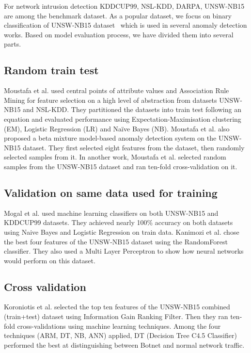\documentclass[14pt, conference]{IEEEtran}
\begin{document}
For network intrusion detection KDDCUP99, NSL-KDD, DARPA, UNSW-NB15 are among the benchmark dataset. As a popular dataset, we focus on binary classification of UNSW-NB15 dataset~\cite{moustafa2015unsw}  which is used in  several anomaly detection works. Based on model evaluation process, we have divided them into several parts.

\subsection{Random train test}
Moustafa et al.\cite{moustafa2017hybrid} used central points of attribute values and Association Rule Mining for feature
selection on a high level of abstraction from datasets UNSW-NB15 and NSL-KDD. They partitioned the datasets into train test following an equation and evaluated performance using Expectation-Maximisation clustering (EM), Logistic Regression (LR) and Naïve Bayes (NB).
Moustafa et al. \cite{moustafa2018anomaly} also proposed a beta mixture
model-based anomaly detection system on the UNSW-NB15 dataset. They first selected eight features from the dataset,
then randomly selected samples from it.
In another work, Moustafa et al. \cite{moustafa2019holistic} selected random samples from
the UNSW-NB15 dataset and ran ten-fold cross-validation on it. %

\subsection{Validation on same data used for training}
Mogal et al.\cite{mogal2017nids} used machine learning classifiers on both UNSW-NB15 and KDDCUP99 datasets.
They achieved nearly 100\% accuracy on both datasets using Naive Bayes and Logistic Regression on train data. Kanimozi et al. \cite{Kanimozhi2019UNSW-NB15} chose the best four features of
the UNSW-NB15 dataset using the RandomForest classifier. They also used a Multi Layer Perceptron to show how neural
networks would perform on this dataset.

\subsection{Cross validation}
Koroniotis et al.\cite{koroniotis2017towards} selected the top ten features of the UNSW-NB15 combined (train+test)
dataset using Information Gain Ranking Filter. Then they ran ten-fold cross-validations using machine learning techniques.
Among the four techniques (ARM, DT, NB, ANN) applied, DT (Decision Tree C4.5 Classifier) performed the best at
 distinguishing between Botnet and normal network traffic.
\end{document}
